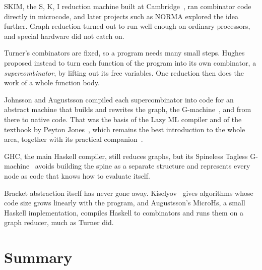 \documentclass[11pt,a4paper]{article}
\theoremstyle{definition}
\theoremstyle{plain}
\begin{document}
\begin{description}[style=nextline, leftmargin=1.2em, itemsep=3pt]
\item[Hardware.] SKIM, the S, K, I reduction machine built at
  Cambridge~\cite{skim80}, ran combinator code directly in microcode, and
  later projects such as NORMA explored the idea further. Graph reduction
  turned out to run well enough on ordinary processors, and special hardware
  did not catch on.
\item[Supercombinators.] Turner's combinators are fixed, so a program needs
  many small steps. Hughes~\cite{hughes82} proposed instead to turn each
  function of the program into its own combinator, a \emph{supercombinator},
  by lifting out its free variables. One reduction then does the work of a
  whole function body.
\item[The G-machine.] Johnsson and Augustsson compiled each supercombinator
  into code for an abstract machine that builds and rewrites the graph, the
  G-machine~\cite{johnsson84,augustsson84}, and from there to native code.
  That was the basis of the Lazy ML compiler and of the textbook by Peyton
  Jones~\cite{spj87}, which remains the best introduction to the whole area,
  together with its practical companion~\cite{spjlester92}.
\item[The STG machine.] GHC, the main Haskell compiler, still reduces graphs,
  but its Spineless Tagless G-machine~\cite{spj92} avoids building the spine
  as a separate structure and represents every node as code that knows how
  to evaluate itself.
\item[Combinators again.] Bracket abstraction itself has never gone away.
  Kiselyov~\cite{kiselyov18} gives algorithms whose code size grows linearly
  with the program, and Augustsson's MicroHs, a small Haskell implementation,
  compiles Haskell to combinators and runs them on a graph reducer, much as
  Turner did.
\end{description}

\section{Summary}
\end{document}
